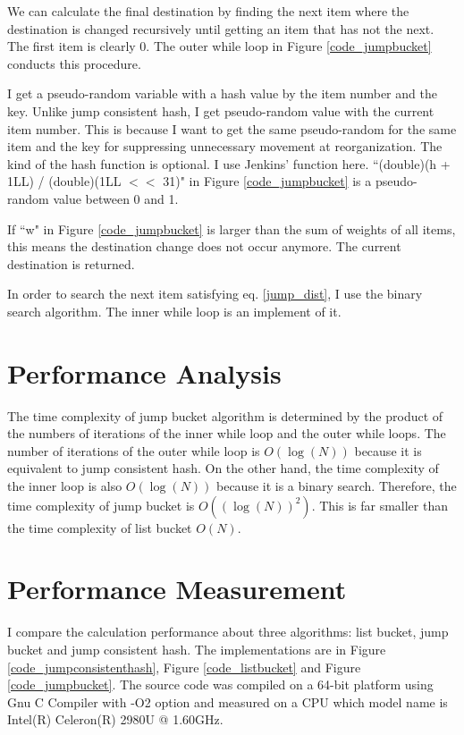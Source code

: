 \documentclass[a4paper,11pt]{article}
\begin{document}
We can calculate the final destination by finding the next item where the destination is changed recursively until getting an item that has not the next. The first item is clearly 0.
The outer while loop in Figure \ref{code_jumpbucket} conducts this procedure.

I get a pseudo-random variable with a hash value by the item number and the key.
Unlike jump consistent hash, I get pseudo-random value with the current item number.
This is because I want to get the same pseudo-random for the same item and the key for suppressing unnecessary movement at reorganization.
The kind of the hash function is optional. I use Jenkins' function\cite{jenkins} here.
``(double)(h + 1LL) / (double)(1LL $<<$ 31)" in Figure \ref{code_jumpbucket} is a pseudo-random value between 0 and 1.

If ``w" in Figure \ref{code_jumpbucket} is larger than the sum of weights of all items, this means the destination change does not occur anymore. The current destination is returned.

In order to search the next item satisfying eq. \eqref{jump_dist}, I use the binary search algorithm. The inner while loop is an implement of it.

\section{Performance Analysis}

The time complexity of jump bucket algorithm is determined by the product of the numbers of iterations of the inner while loop and the outer while loops.
The number of iterations of the outer while loop is $O(\log(N))$ because it is equivalent to jump consistent hash.
On the other hand, the time complexity of the inner loop is also $O(\log(N))$ because it is a binary search.
Therefore, the time complexity of jump bucket is $O((\log(N))^2)$. This is far smaller than the time complexity of list bucket $O(N)$.

\section{Performance Measurement}

I compare the calculation performance about three algorithms: list bucket, jump bucket and jump consistent hash.
The implementations are in Figure \ref{code_jumpconsistenthash}, Figure \ref{code_listbucket} and Figure \ref{code_jumpbucket}.
The source code was compiled on a 64-bit platform using Gnu C Compiler with -O2 option and measured on a CPU which model name is Intel(R) Celeron(R) 2980U @ 1.60GHz.
\end{document}
